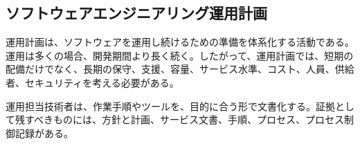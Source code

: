 \subsection{ソフトウェアエンジニアリング運用計画}

運用計画は、ソフトウェアを運用し続けるための準備を体系化する活動である。運用は多くの場合、開発期間より長く続く。したがって、運用計画では、短期の配備だけでなく、長期の保守、支援、容量、サービス水準、コスト、人員、供給者、セキュリティを考える必要がある。

運用担当技術者は、作業手順やツールを、目的に合う形で文書化する。証拠として残すべきものには、方針と計画、サービス文書、手順、プロセス、プロセス制御記録がある。
